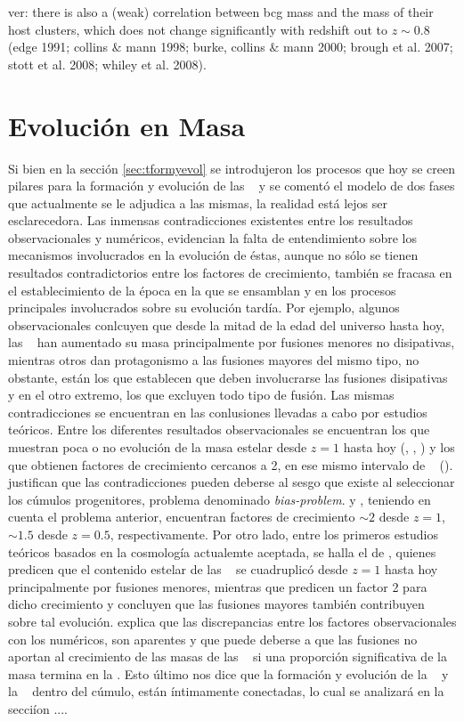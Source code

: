 ver: there is also a (weak) correlation between bcg mass and the mass of their host clusters, which does not change significantly
with redshift out to $z\sim 0.8$ (edge 1991; collins $\&$ mann 1998; burke, collins $\&$ mann 2000; brough et al. 2007; stott et al. 2008;
whiley et al. 2008).

\section{Evoluci\'on en Masa}
Si bien en la secci\'on \ref{sec:tformyevol} se introdujeron
los procesos que hoy se creen pilares para la formaci\'on
y evoluci\'on de las \bcgs~ y 
se coment\'o el modelo de dos fases 
que actualmente se le adjudica a las mismas,
la realidad est\'a lejos ser esclarecedora. Las inmensas contradicciones
existentes entre los resultados observacionales y num\'ericos, evidencian
la falta de entendimiento sobre los mecanismos involucrados en la evoluci\'on
de \'estas, aunque no s\'olo se tienen resultados contradictorios entre los factores
de crecimiento, tambi\'en
se fracasa en el establecimiento de la \'epoca en la que se ensamblan y en los procesos
principales involucrados sobre su evoluci\'on tard\'ia. Por ejemplo, algunos observacionales conlcuyen que desde la mitad
de la edad del universo hasta hoy, las \bcgs~ han aumentado su masa principalmente por fusiones menores no disipativas, mientras
otros dan protagonismo a las fusiones mayores del mismo tipo, no obstante, est\'an los que establecen que deben involucrarse las 
fusiones disipativas y en el otro extremo, los que excluyen todo tipo de fusi\'on. Las mismas
contradicciones se encuentran en las conlusiones llevadas a cabo por estudios te\'oricos.
Entre los diferentes resultados observacionales se encuentran los que muestran poca o no evoluci\'on de la masa estelar
desde $z=1$ hasta hoy (\cite{whi08}, \cite{col09}, \cite{sto10})
y los que obtienen factores de crecimiento cercanos a 2, en ese mismo intervalo
de \z~ (\cite{ara98}). \cite{bur00} justifican que las contradicciones pueden 
deberse al sesgo que existe al seleccionar los c\'umulos progenitores, problema denominado \textit{bias-problem}.
\cite{lid12} y \cite{bai14}, teniendo en cuenta
el problema anterior, encuentran factores de crecimiento $\sim2$ desde $z=1$, $\sim1.5$ desde $z=0.5$, respectivamente.
Por otro lado, entre los primeros estudios te\'oricos
basados en la cosmolog\'ia actualemte aceptada,
se halla el de \cite{del07}, quienes predicen que el contenido estelar de las \bcgs~
se cuadruplic\'o desde $z=1$ hasta hoy principalmente por fusiones menores, mientras que
\cite{lap13} predicen un factor 2 para dicho crecimiento y concluyen que las fusiones
mayores tambi\'en contribuyen sobre tal evoluci\'on.
\cite{gro17} explica que las discrepancias entre los factores observacionales con los num\'ericos,
son aparentes y que puede deberse a que las fusiones no aportan al crecimiento
de las masas de las \bcgs~ si una proporci\'on significativa de la masa termina en la \icl.
Esto \'ultimo nos dice que la formaci\'on y evoluci\'on de la \bcg~ y la \icl~ dentro del c\'umulo,
est\'an \'intimamente conectadas, lo cual se analizar\'a en la secci\'ion ....


